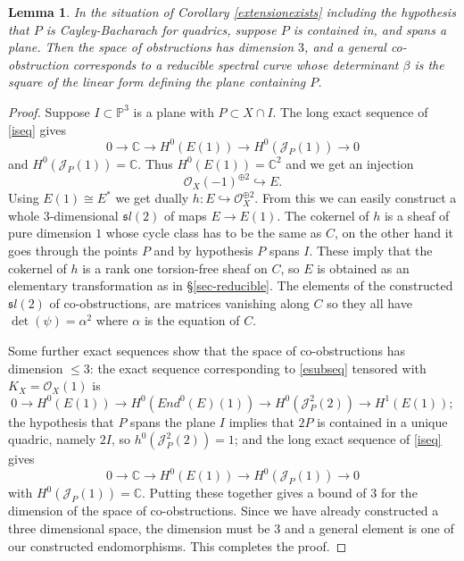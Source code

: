 \documentclass{amsart}
\theoremstyle{plain}
\newtheorem{lemma}[theorem]{Lemma}
\numberwithin{equation}{section}
\begin{document}
\begin{lemma}
\label{planesit}
In the situation of Corollary  \ref{extensionexists} including the hypothesis
that $P$ is Cayley-Bacharach for quadrics, suppose
$P$ is contained in, and spans a plane. Then the space
of obstructions has dimension $3$, and a general co-obstruction
corresponds to a reducible spectral curve whose determinant $\beta$ is the
square of the linear form defining the plane containing $P$.
\end{lemma}
\begin{proof}
Suppose $I\subset {{\mathbb P}} ^3$ is a plane with $P\subset X\cap I$. 
The long exact sequence of \eqref{iseq} gives
$$
0\rightarrow {{\mathbb C}} \rightarrow H^0(E(1))\rightarrow H^0({{\mathcal J}} _P(1)) \rightarrow 0
$$
and $H^0({{\mathcal J}} _P(1))={{\mathbb C}}$. Thus $H^0(E(1))={{\mathbb C}} ^2$ and we get an injection 
$$
{{\mathcal O}} _X(-1)^{\oplus 2}\hookrightarrow E.
$$
Using $E(1)\cong E^{\ast}$ we get dually $h:E\hookrightarrow {{\mathcal O}} _X^{\oplus 2}$.
From this we can easily construct a whole $3$-dimensional ${\mathfrak sl}(2)$ of 
maps $E\rightarrow E(1)$. The cokernel of $h$ is a sheaf of pure dimension $1$
whose cycle class has to be the same as $C$, on the other hand it goes
through the points $P$ and by hypothesis $P$ spans $I$. These imply
that the cokernel of $h$ is a rank one torsion-free sheaf on $C$,
so $E$ is obtained as an elementary transformation as in \S \ref{sec-reducible}.
The elements of the constructed ${\mathfrak sl}(2)$
of co-obstructions, are matrices vanishing along $C$ so they all have $\det (\psi )=\alpha ^2$ where $\alpha$ is the equation of $C$. 

Some further exact sequences show that the space of co-obstructions has dimension $\leq 3$:
the exact sequence corresponding to \eqref{esubseq} tensored with $K_X={{\mathcal O}} _X(1)$ is
$$
0\rightarrow H^0(E(1))\rightarrow H^0(End ^0(E)(1))\rightarrow H^0({{\mathcal J}} ^2_P(2))\rightarrow
H^1(E(1));
$$
the hypothesis that $P$ spans the plane $I$ implies that $2P$ is contained in a unique
quadric, namely $2I$, so
$h^0({{\mathcal J}} ^2_P(2))=1$; and 
the long exact sequence of \eqref{iseq} gives
$$
0\rightarrow {{\mathbb C}} \rightarrow H^0(E(1))\rightarrow H^0({{\mathcal J}} _P(1)) \rightarrow 0
$$
with $H^0({{\mathcal J}} _P(1))={{\mathbb C}}$. Putting these together gives a bound of $3$ for the dimension
of the space of co-obstructions. Since we have already constructed a three dimensional
space, the dimension must be $3$ and a general element is one of our constructed 
endomorphisms. This completes the proof. 
\end{proof}
\end{document}
